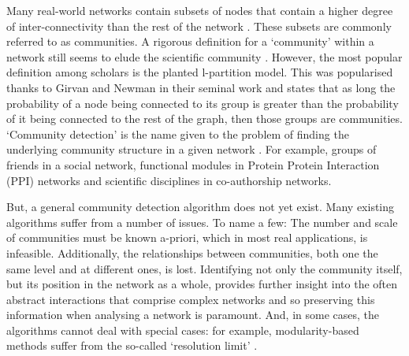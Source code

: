 \documentclass{report}
\begin{document}
	Many real-world networks contain subsets of nodes that contain a higher degree of inter-connectivity than the rest of the network
	\cite{girvan2002community,palla2005uncovering,lancichinetti2009detecting}.
	These subsets are commonly referred to as communities. 
	A rigorous definition for a `community' within a network still seems to elude the scientific community \cite{lancichinetti2009detecting}.
	However, the most popular definition among scholars is the planted l-partition model.
	This was popularised thanks to Girvan and Newman in their seminal work \cite{girvan2002community} and states that as long the probability of a node being connected to its group is greater than the probability of it being connected to the rest of the graph, then those groups are communities. 
	`Community detection' is the name given to the problem of finding the underlying community structure in a given network \cite{girvan2002community}. 
	For example, groups of friends in a social network, functional modules in Protein Protein Interaction (PPI) networks and scientific disciplines in co-authorship networks.
	

	But, a general community detection algorithm does not yet exist.
	Many existing algorithms suffer from a number of issues. 
	To name a few:
	The number and scale of communities must be known a-priori, which in most real applications, is infeasible.
	Additionally, the relationships between communities, both one the same level and at different ones, is lost.
	Identifying not only the community itself, but its position in the network as a whole, provides further insight into the often abstract interactions that comprise complex networks and so preserving this information when analysing a network is paramount.
	And, in some cases, the algorithms cannot deal with special cases: for example, modularity-based methods suffer from the so-called `resolution limit' \cite{fortunato2007resolution}.
	
\end{document}
